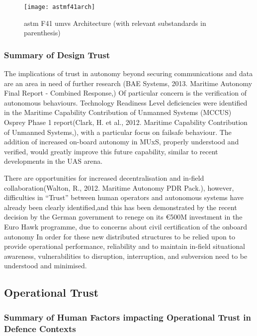 \begin{figure}
  \texttt{[image: astmf41arch]}
  \caption{\gls{astm} F41 \gls{umvs} Architecture  (with relevant substandards in parenthesis)}
  \label{fig:astmf41arch}
\end{figure}

\subsubsection{Summary of Design Trust}

The implications of trust in autonomy beyond securing communications and data are an area in need of further research (BAE Systems, 2013. Maritime Autonomy Final Report - Combined Response,)
Of particular concern is the verification of autonomous behaviours.
Technology Readiness Level deficiencies were identified in the Maritime Capability Contribution of Unmanned Systems (MCCUS) Osprey Phase 1 report(Clark, H. et al., 2012. Maritime Capability Contribution of Unmanned Systems,), with a particular focus on failsafe behaviour.
The addition of increased on-board autonomy in MUxS, properly understood and verified, would greatly improve this future capability, similar to recent developments in the UAS arena\cite{Cummings2010}.

There are opportunities for increased decentralisation and in-field collaboration(Walton, R., 2012. Maritime Autonomy PDR Pack.), however, difficulties in “Trust” between human operators and autonomous systems have already been clearly identified\cite{Chen2011b},and this has been demonstrated by the recent decision by the German government to renege on its \euro500M investment in the Euro Hawk programme, due to concerns about civil certification of the onboard autonomy\cite{Mehta2013}
In order for these new distributed structures to be relied upon to provide operational performance, reliability and to maintain in-field situational awareness, vulnerabilities to disruption, interruption, and subversion need to be understood and minimised.

\subsection{Operational Trust}

\subsubsection{Summary of Human Factors impacting Operational Trust in Defence Contexts}

